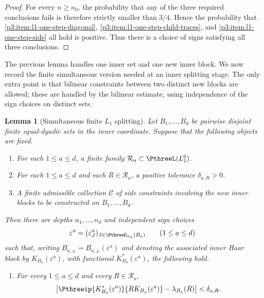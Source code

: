 \documentclass[11pt,reqno]{amsart}
\makeatletter
\theoremstyle{plain}
\newtheorem{lemma}[lemma]{Lemma}
\theoremstyle{definition}
\newcounter{problempaper}
\newenvironment{problempaperbody}{%
  \setcounter{subsection}{0}%
  \setcounter{subsubsection}{0}%
  \setcounter{paragraph}{0}%
  \renewcommand{\thesubsection}{\arabic{subsection}}%
  \renewcommand{\thesubsubsection}{\thesubsection.\arabic{subsubsection}}%
  \renewcommand{\theparagraph}{\thesubsubsection.\arabic{paragraph}}%
  \let\problem@outersection\section
  \let\problem@outersubsection\subsection
  \let\problem@outersubsubsection\subsubsection
  \let\problem@outerparagraph\paragraph
  \let\section\problem@papersection
  \let\subsection\problem@papersubsection
  \let\subsubsection\problem@papersubsubsection
}{%
  \let\section\problem@outersection
  \let\subsection\problem@outersubsection
  \let\subsubsection\problem@outersubsubsection
  \let\paragraph\problem@outerparagraph
}
\newcommand{\problem@target}[2]{%
  \hypertarget{problem-\theproblempaper-#1-#2}{}%
}
\newcommand{\problem@paperheading}[3]{%
  \par\bigskip
  \problem@target{#1}{#2}%
  \noindent{\large\bfseries #2.\quad #3\par}%
  \nobreak\smallskip
}
\newcommand{\problem@papersubheading}[3]{%
  \par\medskip
  \problem@target{#1}{#2}%
  \noindent{\normalsize\bfseries #2.\quad #3\par}%
  \nobreak\smallskip
}
\newcommand{\problem@papersubsubheading}[3]{%
  \par\smallskip
  \problem@target{#1}{#2}%
  \noindent{\normalsize\itshape #2.\quad #3.\ }%
}
\def\problem@papersection{%
  \@ifstar{\problem@papersectionstar}{\problem@papersectionnostar}%
}
\def\problem@papersectionstar#1{%
  \par\bigskip\noindent{\large\bfseries #1\par}\nobreak\smallskip
}
\def\problem@papersectionnostar#1{%
  \refstepcounter{subsection}%
  \setcounter{subsubsection}{0}%
  \setcounter{paragraph}{0}%
  \problem@paperheading{section}{\thesubsection}{#1}%
  \problem@writecontentsline{section}{\thesubsection}{#1}%
}
\def\problem@papersubsection{%
  \@ifstar{\problem@papersubsectionstar}{\problem@papersubsectionnostar}%
}
\def\problem@papersubsectionstar#1{%
  \par\medskip\noindent{\normalsize\bfseries #1\par}\nobreak\smallskip
}
\def\problem@papersubsectionnostar#1{%
  \refstepcounter{subsubsection}%
  \setcounter{paragraph}{0}%
  \problem@papersubheading{subsection}{\thesubsubsection}{#1}%
  \problem@writecontentsline{subsection}{\thesubsubsection}{#1}%
}
\def\problem@papersubsubsection{%
  \@ifstar{\problem@papersubsubsectionstar}{\problem@papersubsubsectionnostar}%
}
\def\problem@papersubsubsectionstar#1{%
  \par\smallskip\noindent{\normalsize\itshape #1.\ }%
}
\def\problem@papersubsubsectionnostar#1{%
  \refstepcounter{paragraph}%
  \problem@papersubsubheading{subsubsection}{\theparagraph}{#1}%
  \problem@writecontentsline{subsubsection}{\theparagraph}{#1}%
}
\newcommand{\problem@writecontentsline}[3]{%
  \begingroup
  \protected@write\@auxout{}{%
    \string\problemcontentsentry{\theproblempaper}{#1}{#2}{#3}{\thepage}%
  }%
  \endgroup
}
\newcommand{\problemcontentsentry}[5]{%
  \@ifundefined{problemcontents@#1}{%
    \expandafter\gdef\csname problemcontents@#1\endcsname{}%
  }{}%
  \expandafter\g@addto@macro\csname problemcontents@#1\endcsname{%
    \problemcontentsline{#1}{#2}{#3}{#4}{#5}%
  }%
}
\newcommand{\problemcontentslink}[4]{%
  \hyperlink{problem-#1-#2-#3}{#4}%
}
\newcommand{\problemcontentsline}[5]{%
  \ifstrequal{#2}{section}{%
    \par\noindent
    \problemcontentslink{#1}{#2}{#3}{\makebox[2.5em][l]{#3}#4}%
    \nobreak\dotfill
    \problemcontentslink{#1}{#2}{#3}{#5}\par
  }{%
    \ifstrequal{#2}{subsection}{%
      \par\noindent\hspace*{1.5em}%
      \problemcontentslink{#1}{#2}{#3}{\makebox[3.5em][l]{#3}#4}%
      \nobreak\dotfill
      \problemcontentslink{#1}{#2}{#3}{#5}\par
    }{%
      \par\noindent\hspace*{3em}%
      \problemcontentslink{#1}{#2}{#3}{\makebox[4.5em][l]{#3}#4}%
      \nobreak\dotfill
      \problemcontentslink{#1}{#2}{#3}{#5}\par
    }%
  }%
}
\makeatother
\begin{document}
\begin{problempaperbody}
\begin{proof}
For every $n\geq n_0$, the probability that any of the three required conclusions fails is therefore strictly smaller than $3/4$. Hence the probability that \ref{p3:item:l1-one-step-diagonal}, \ref{p3:item:l1-one-step-child-traces}, and \ref{p3:item:l1-one-step-side} all hold is positive. Thus there is a choice of signs satisfying all three conclusions.
\end{proof}




The previous lemma handles one inner set and one new inner block. We now record the finite simultaneous version needed at an inner splitting stage. The only extra point is that bilinear constraints between two distinct new blocks are allowed; these are handled by the bilinear estimate, using independence of the sign choices on distinct sets.

\begin{lemma}[Simultaneous finite $L_1$ splitting]
\label{p3:lem:l1-simultaneous}
Let $B_1,\ldots,B_d$ be pairwise disjoint finite equal-dyadic sets in the inner coordinate. Suppose that the following objects are fixed.

\begin{enumerate}[label=\textup{(\alph*)}]
\item \label{p3:item:l1-sim-hyp-operators} For each $1\leq a\leq d$, a finite family $\mathcal R_a\subset\PthreeL(L_1^0)$.

\item \label{p3:item:l1-sim-hyp-tolerances} For each $1\leq a\leq d$ and each $R\in\mathcal R_a$, a positive tolerance $\delta_{a,R}>0$.

\item \label{p3:item:l1-sim-hyp-side} A finite admissible collection $\mathscr C$ of side constraints involving the new inner blocks to be constructed on $B_1,\ldots,B_d$.
\end{enumerate}

Then there are depths $n_1,\ldots,n_d$ and independent sign choices
\begin{equation*}
        \varepsilon^a=(\varepsilon_J^a)_{J\in\PthreeD_{n_a}(B_a)}\qquad(1\leq a\leq d)
\end{equation*}
such that, writing $B_{a,\pm}=B_{a,\pm}(\varepsilon^a)$ and denoting the associated inner Haar block by $K_{B_a}(\varepsilon^a)$, with functional $K_{B_a}^*(\varepsilon^a)$, the following hold.

\begin{enumerate}[label=\textup{(\roman*)}]
\item \label{p3:item:l1-sim-concl-diagonal} For every $1\leq a\leq d$ and every $R\in\mathcal R_a$,
\begin{equation*}
        \left|\Pthreeip{K_{B_a}^*(\varepsilon^a)}{RK_{B_a}(\varepsilon^a)}-\lambda_{B_a}(R)\right|<\delta_{a,R}.
\end{equation*}


\end{enumerate}
\end{lemma}
\end{problempaperbody}
\end{document}
